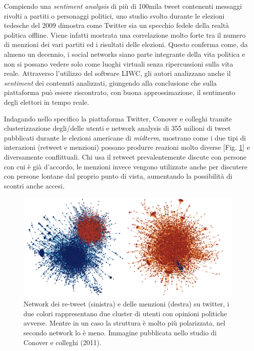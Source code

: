 Compiendo una \textit{sentiment analysis} di più di 100mila tweet contenenti messaggi rivolti a partiti o personaggi politici, uno studio svolto durante le elezioni tedesche del 2009 \citep{tumasjan2011} dimostra come Twitter sia un specchio fedele della realtà politica offline. Viene infatti mostrata una correlazione molto forte tra il numero di menzioni dei vari partiti ed i risultati delle elezioni. Questo conferma come, da almeno un decennio, i social networks siano parte integrante della vita politica e non si possano vedere solo come luoghi virtuali senza ripercussioni sulla vita reale. Attraverso l'utilizzo del software LIWC, gli autori analizzano anche il \textit{sentiment} dei contenuti analizzati, giungendo alla conclusione che sulla piattaforma può essere riscontrato, con buona approssimazione, il sentimento degli elettori in tempo reale.

Indagando nello specifico la piattaforma Twitter, Conover e colleghi \citep{conover2011} tramite clusterizzazione degli/delle utenti e network analysis di 355 milioni di tweet pubblicati durante le elezioni americane di \textit{midterm}, mostrano come i due tipi di interazioni (retweet e menzioni) possano produrre reazioni molto diverse [Fig. \ref{fig:twitternet}] e diversamente conflittuali. Chi usa il retweet prevalentemente discute con persone con cui è già d'accordo, le menzioni invece vengono utilizzate anche per discutere con persone lontane dal proprio punto di vista, aumentando la possibilità di scontri anche accesi.
\begin{figure}
	\includegraphics[width=\textwidth]{figures/twitternet}
	\caption{Network dei re-tweet (sinistra) e delle menzioni (destra) su twitter, i due colori rappresentano due cluster di utenti con opinioni politiche avverse. Mentre in un caso la struttura è molto più polarizzata, nel secondo network lo è meno. Immagine pubblicata nello studio di Conover e colleghi (2011).}
	\label{fig:twitternet}
\end{figure}


